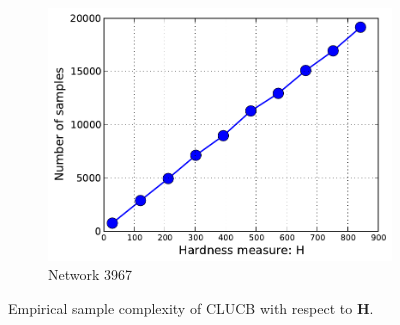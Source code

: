 \documentclass{article}
\newcommand{\Algorithm}{{\small \textsf{CLUCB}}\xspace}
\begin{document}
\begin{figure}[ht]
\begin{subfigure}[c]{\imgsize\textwidth}
	\includegraphics[width=\textwidth]{fig/exp/mst-cs-3967}
	\caption{Network 3967}
\end{subfigure}
\caption{Empirical sample complexity of \Algorithm with respect to $\mathbf H$.}
\label{fig:exp2}
\end{figure}
\end{document}
